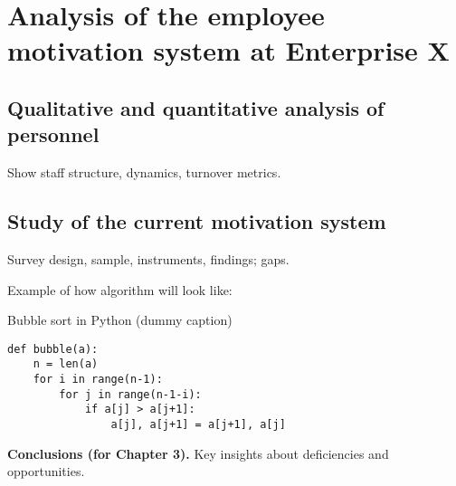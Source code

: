 \chapter{Analysis of the employee motivation system at Enterprise X}
\section{Qualitative and quantitative analysis of personnel}
Show staff structure, dynamics, turnover metrics.

\section{Study of the current motivation system}
Survey design, sample, instruments, findings; gaps.

Example of how algorithm will look like:

\begin{listing}[h]
\caption{Bubble sort in Python (dummy caption)}
\begin{verbatim}
def bubble(a):
    n = len(a)
    for i in range(n-1):
        for j in range(n-1-i):
            if a[j] > a[j+1]:
                a[j], a[j+1] = a[j+1], a[j]
\end{verbatim}
\label{lst:bubble}
\end{listing}


\noindent\textbf{Conclusions (for Chapter 3).} Key insights about deficiencies and opportunities.

